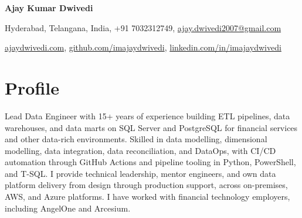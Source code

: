 \documentclass[10pt,a4paper]{article}
\begin{document}
\begin{center}
{\Huge\bfseries Ajay Kumar Dwivedi}

\vspace{6pt}
Hyderabad, Telangana, India, +91 7032312749, \href{mailto:ajay.dwivedi2007@gmail.com}{ajay.dwivedi2007@gmail.com}

\vspace{2pt}
\href{https://ajaydwivedi.com/}{ajaydwivedi.com}, \href{https://github.com/imajaydwivedi}{github.com/imajaydwivedi}, \href{https://linkedin.com/in/imajaydwivedi/}{linkedin.com/in/imajaydwivedi}
\end{center}

\section{Profile}
Lead Data Engineer with 15+ years of experience building ETL pipelines, data warehouses, and data marts on SQL Server and PostgreSQL for financial services and other data-rich environments. Skilled in data modelling, dimensional modelling, data integration, data reconciliation, and DataOps, with CI/CD automation through GitHub Actions and pipeline tooling in Python, PowerShell, and T-SQL. I provide technical leadership, mentor engineers, and own data platform delivery from design through production support, across on-premises, AWS, and Azure platforms. I have worked with financial technology employers, including AngelOne and Arcesium.
\end{document}
